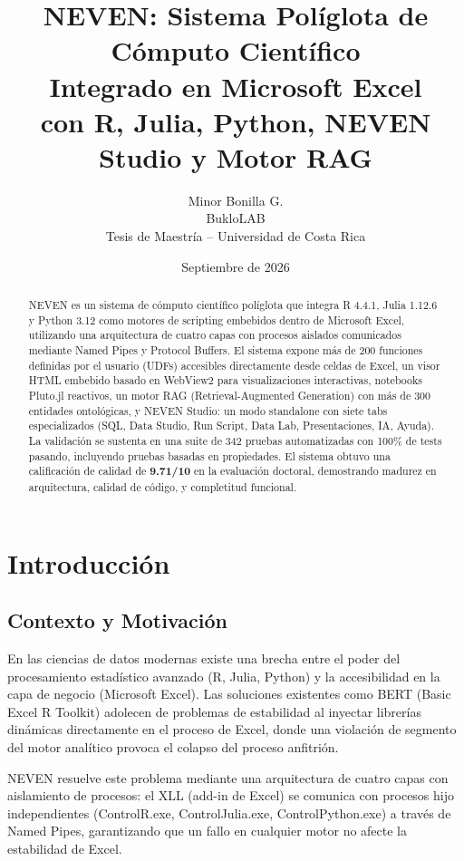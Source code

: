 \documentclass[12pt, a4paper]{report}
\title{\textbf{NEVEN: Sistema Políglota de Cómputo Científico\\Integrado en Microsoft Excel\\con R, Julia, Python, NEVEN Studio y Motor RAG}}
\author{Minor Bonilla G.\\BukloLAB\\Tesis de Maestría -- Universidad de Costa Rica}
\date{Septiembre de 2026}
\begin{document}
\maketitle

\begin{abstract}
NEVEN es un sistema de cómputo científico políglota que integra R 4.4.1, Julia 1.12.6 y Python 3.12 como motores de scripting embebidos dentro de Microsoft Excel, utilizando una arquitectura de cuatro capas con procesos aislados comunicados mediante Named Pipes y Protocol Buffers. El sistema expone más de 200 funciones definidas por el usuario (UDFs) accesibles directamente desde celdas de Excel, un visor HTML embebido basado en WebView2 para visualizaciones interactivas, notebooks Pluto.jl reactivos, un motor RAG (Retrieval-Augmented Generation) con más de 300 entidades ontológicas, y NEVEN Studio: un modo standalone con siete tabs especializados (SQL, Data Studio, Run Script, Data Lab, Presentaciones, IA, Ayuda). La validación se sustenta en una suite de 342 pruebas automatizadas con 100\% de tests pasando, incluyendo pruebas basadas en propiedades. El sistema obtuvo una calificación de calidad de \textbf{9.71/10} en la evaluación doctoral, demostrando madurez en arquitectura, calidad de código, y completitud funcional.
\end{abstract}

\tableofcontents
\newpage

\chapter{Introducción}

\section{Contexto y Motivación}

En las ciencias de datos modernas existe una brecha entre el poder del procesamiento estadístico avanzado (R, Julia, Python) y la accesibilidad en la capa de negocio (Microsoft Excel). Las soluciones existentes como BERT (Basic Excel R Toolkit) adolecen de problemas de estabilidad al inyectar librerías dinámicas directamente en el proceso de Excel, donde una violación de segmento del motor analítico provoca el colapso del proceso anfitrión.

NEVEN resuelve este problema mediante una arquitectura de cuatro capas con aislamiento de procesos: el XLL (add-in de Excel) se comunica con procesos hijo independientes (ControlR.exe, ControlJulia.exe, ControlPython.exe) a través de Named Pipes, garantizando que un fallo en cualquier motor no afecte la estabilidad de Excel.
\end{document}
